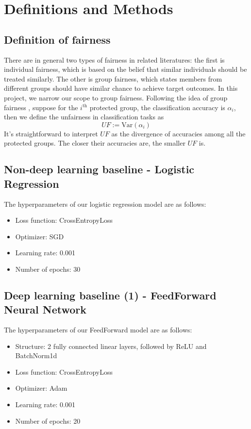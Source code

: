 \section{Definitions and Methods}


\subsection{Definition of fairness}
There are in general two types of fairness in related literatures: the first is individual fairness, which is based on the belief that similar individuals should be treated similarly. The other is group fairness, which states members from different groups should have similar chance to achieve target outcomes. In this project, we narrow our scope to group fairness. Following the idea of group fairness \cite{hardt2016equality, dwork2012fairness, feldman2015certifying}, suppose for the $i^{\text{th}}$ protected group, the classification accuracy is $\alpha_i$, then we define the unfairness in classification tasks as
\begin{equation}
UF := \text{Var}(\alpha_i)
\end{equation}
It's straightforward to interpret $UF$ as the divergence of accuracies among all the protected groups. The closer their accuracies are, the smaller $UF$ is.

\subsection{Non-deep learning baseline - Logistic Regression}
The hyperparameters of our logistic regression model are as follows:
\begin{itemize}
    \item Loss function: CrossEntropyLoss
    \item Optimizer: SGD
    \item Learning rate: 0.001
    \item Number of epochs: 30
\end{itemize}

\subsection{Deep learning baseline (1) -  FeedForward Neural Network}
The hyperparameters of our FeedForward model are as follows:
\begin{itemize}
    \item Structure: 2 fully connected linear layers, followed by ReLU and BatchNorm1d
    \item Loss function: CrossEntropyLoss
    \item Optimizer: Adam
    \item Learning rate: 0.001
    \item Number of epochs: 20
\end{itemize}


